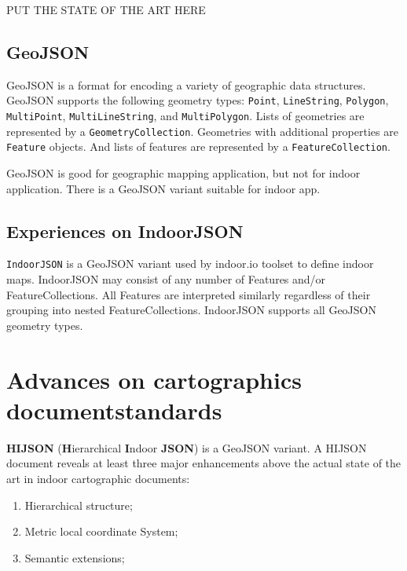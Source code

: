 \documentclass{sig-alternate}
\begin{document}
PUT THE STATE OF THE ART HERE

\subsection{GeoJSON}\label{geojson}

GeoJSON is a format for encoding a variety of geographic data
structures. GeoJSON supports the following geometry types:
\texttt{Point}, \texttt{LineString}, \texttt{Polygon},
\texttt{MultiPoint}, \texttt{MultiLineString}, and
\texttt{MultiPolygon}. Lists of geometries are represented by a
\texttt{GeometryCollection}. Geometries with additional properties are
\texttt{Feature} objects. And lists of features are represented by a
\texttt{FeatureCollection}.

GeoJSON is good for geographic mapping application, but not for indoor
application. There is a GeoJSON variant suitable for indoor app.

\subsection{Experiences on IndoorJSON}\label{experiences-on-indoor-json}

\texttt{IndoorJSON} is a GeoJSON variant used by indoor.io toolset to define indoor maps. IndoorJSON may consist of any number of Features and/or FeatureCollections. All Features are interpreted similarly regardless of their grouping into nested FeatureCollections. IndoorJSON supports all GeoJSON geometry types.


\section{Advances on cartographics documentstandards}\label{advances-on-cartographics-document-standards}

\textbf{HIJSON} (\textbf{H}ierarchical \textbf{I}ndoor \textbf{JSON}) is a GeoJSON variant. A HIJSON document reveals at least three major enhancements above the actual state of the art in indoor cartographic documents:
\begin{enumerate}
\def\labelenumi{\arabic{enumi}.}
\itemsep1pt\parskip0pt
\item
  Hierarchical structure;
\item
  Metric local coordinate System;
\item
  Semantic extensions;
\end{enumerate}
\end{document}
